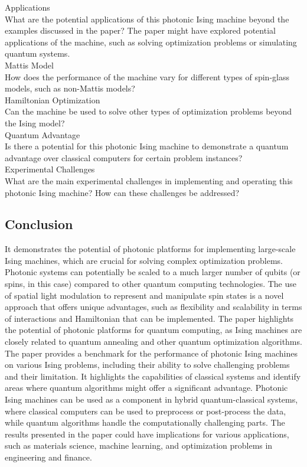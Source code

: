 Applications\\
What are the potential applications of this photonic Ising machine beyond the examples discussed in the paper? The paper might have explored potential applications of the machine, such as solving optimization problems or simulating quantum systems.\\

Mattis Model\\
How does the performance of the machine vary for different types of spin-glass models, such as non-Mattis models?\\

Hamiltonian Optimization\\
Can the machine be used to solve other types of optimization problems beyond the Ising model?\\

Quantum Advantage\\
Is there a potential for this photonic Ising machine to demonstrate a quantum advantage over classical computers for certain problem instances?\\

Experimental Challenges\\
What are the main experimental challenges in implementing and operating this photonic Ising machine? How can these challenges be addressed?\\

\subsection{Conclusion}
It demonstrates the potential of photonic platforms for implementing large-scale Ising machines, which are crucial for solving complex optimization problems.  Photonic systems can potentially be scaled to a much larger number of qubits (or spins, in this case) compared to other quantum computing technologies. The use of spatial light modulation to represent and manipulate spin states is a novel approach that offers unique advantages, such as flexibility and scalability in terms of interactions and Hamiltonian that can be implemented.  The paper highlights the potential of photonic platforms for quantum computing, as Ising machines are closely related to quantum annealing and other quantum optimization algorithms. The paper provides a benchmark for the performance of photonic Ising machines  on various Ising problems, including their ability to solve challenging problems and their limitation. It highlights the capabilities of classical systems and identify areas where quantum algorithms might offer a significant advantage. Photonic Ising machines can be used as a component in hybrid quantum-classical systems, where classical computers can be used to preprocess or post-process the data, while quantum algorithms handle the computationally challenging parts. The results presented in the paper could have implications for various applications, such as materials science, machine learning, and optimization problems in engineering and finance.\\

